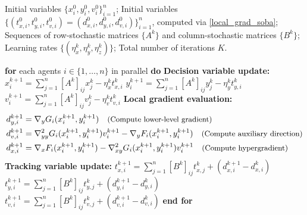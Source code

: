 \documentclass{article}
\theoremstyle{plain}
\theoremstyle{definition}
\theoremstyle{remark}
\begin{document}
\begin{algorithm}[t]
    \caption{PushPull\_SOBA Algorithm}
    \label{alg:distsoba}
    \begin{algorithmic}[1]
         Initial variables $\{x_{i}^{0}, y_{i}^{0}, v_{i}^{0}\}_{i=1}^n$;
        Initial variables $\{(t_{x,i}^{0}, t_{y,i}^{0}, t_{v,i}^{0})=(d_{x,i}^{0}, d_{y,i}^{0}, d_{v,i}^{0})\}_{i=1}^n$, computed via \eqref{local_grad_soba}; 
        Sequences of row-stochastic matrices $\{A^{k}\}$ and column-stochastic matrices $\{B^{k}\}$; 
        Learning rates $\{(\eta_{x}^{k}, \eta_{y}^{k}, \eta_{z}^{k})\}$;  Total number of iterations $K$.
        
         \STATE \textbf{for} each agents $i \in \{1,\ldots,n\}$ in parallel \textbf{do}
            \STATE \quad \textbf{Decision variable update:}
            \STATE  \quad \quad \quad $x_{i}^{k+1} = \sum_{j=1}^n [A^k]_{ij} x_{j}^{k} - \eta_{x}^{k} t_{x,i}^{k}$
            \STATE \quad \quad \quad $y_{i}^{k+1} = \sum_{j=1}^n [A^k]_{ij} y_{j}^{k} - \eta_{y}^{k} t_{y,i}^{k}$
            \STATE \quad \quad \quad $v_{i}^{k+1} = \sum_{j=1}^n [A^k]_{ij} v_{j}^{k} - \eta_{v}^{k} t_{v,i}^{k}$
\STATE \quad \textbf{Local gradient evaluation:}
    \setlength{\abovedisplayskip}{0pt}
    \setlength{\belowdisplayskip}{0pt}
    \setlength{\abovedisplayshortskip}{0pt}
    \setlength{\belowdisplayshortskip}{0pt}
    \begin{subequations}\label{local_grad_soba}
        \begin{align}
            d_{y,i}^{k+1} &= \nabla_y G_i(x_i^{k+1}, y_i^{k+1}) 
            \quad \text{\small (Compute lower-level gradient)} \label{eq:dy_text} \\
            d_{v,i}^{k+1} &= \nabla_{yy}^2 G_i(x_i^{k+1}, y_i^{k+1}) v_i^{k+1} - \nabla_y F_i(x_i^{k+1}, y_i^{k+1}) 
            \quad \text{\small (Compute auxiliary direction)} \label{eq:dv_text} \\
            d_{x,i}^{k+1} &= \nabla_x F_i(x_i^{k+1}, y_i^{k+1}) - \nabla_{xy}^2 G_i(x_i^{k+1}, y_i^{k+1}) v_i^{k+1} 
            \quad \text{\small (Compute hypergradient)} \label{eq:dx_text}
        \end{align}
    \end{subequations}
            \STATE \quad \textbf{Tracking variable update:}
            \STATE \quad \quad \quad $t_{x,i}^{k+1} = \sum_{j=1}^n [B^k]_{ij} t_{x,j}^{k} + (d_{x,i}^{k+1} - d_{x,i}^{k})$
            \STATE \quad \quad \quad $t_{y,i}^{k+1} = \sum_{j=1}^n [B^k]_{ij} t_{y,j}^{k} + (d_{y,i}^{k+1} - d_{y,i}^{k})$
            \STATE  \quad \quad \quad $t_{v,i}^{k+1} = \sum_{j=1}^n [B^k]_{ij} t_{v,j}^{k} + (d_{v,i}^{k+1} - d_{v,i}^{k})$
        \STATE \textbf{end for}
        \ENDFOR
    \end{algorithmic}
\end{algorithm}
\end{document}
